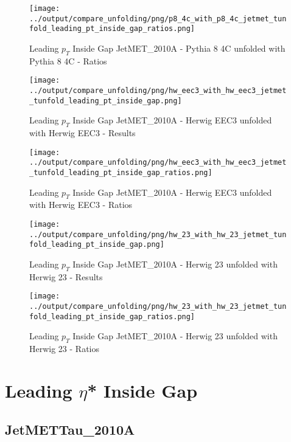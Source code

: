 \documentclass[11pt]{book}
\begin{document}
\begin{figure}[ht]
\centering
\texttt{[image: ../output/compare\_unfolding/png/p8\_4c\_with\_p8\_4c\_jetmet\_tunfold\_leading\_pt\_inside\_gap\_ratios.png]}
\caption{Leading $p_{T}$ Inside Gap JetMET\_2010A - Pythia 8 4C unfolded with Pythia 8 4C - Ratios}
\label{p8_p8_jetmet_tunfold_leading_pt_inside_gap_b}
\end{figure}

\begin{figure}[ht]
\centering
\texttt{[image: ../output/compare\_unfolding/png/hw\_eec3\_with\_hw\_eec3\_jetmet\_tunfold\_leading\_pt\_inside\_gap.png]}
\caption{Leading $p_{T}$ Inside Gap JetMET\_2010A - Herwig EEC3 unfolded with Herwig EEC3 - Results}
\label{hw_eec3_hw_eec3_jetmet_tunfold_leading_pt_inside_gap_a}
\end{figure}

\begin{figure}[ht]
\centering
\texttt{[image: ../output/compare\_unfolding/png/hw\_eec3\_with\_hw\_eec3\_jetmet\_tunfold\_leading\_pt\_inside\_gap\_ratios.png]}
\caption{Leading $p_{T}$ Inside Gap JetMET\_2010A - Herwig EEC3 unfolded with Herwig EEC3 - Ratios}
\label{hw_eec3_hw_eec3_jetmet_tunfold_leading_pt_inside_gap_b}
\end{figure}

\begin{figure}[ht]
\centering
\texttt{[image: ../output/compare\_unfolding/png/hw\_23\_with\_hw\_23\_jetmet\_tunfold\_leading\_pt\_inside\_gap.png]}
\caption{Leading $p_{T}$ Inside Gap JetMET\_2010A - Herwig 23 unfolded with Herwig 23 - Results}
\label{hw_23_hw_23_jetmet_tunfold_leading_pt_inside_gap_a}
\end{figure}

\begin{figure}[ht]
\centering
\texttt{[image: ../output/compare\_unfolding/png/hw\_23\_with\_hw\_23\_jetmet\_tunfold\_leading\_pt\_inside\_gap\_ratios.png]}
\caption{Leading $p_{T}$ Inside Gap JetMET\_2010A - Herwig 23 unfolded with Herwig 23 - Ratios}
\label{hw_23_hw_23_jetmet_tunfold_leading_pt_inside_gap_b}
\end{figure}






\newpage
\chapter{Leading $\eta$* Inside Gap}
\section{JetMETTau\_2010A}
\end{document}
